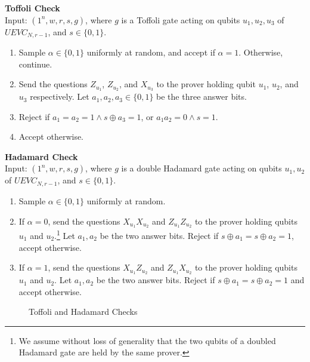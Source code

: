 \vspace{10pt}
\begin{center}
\begin{mdframed}
    \textbf{Toffoli Check} \\
	Input: $(1^n,w,r,s,g)$, where $g$ is a Toffoli gate acting on qubits $u_1,u_2,u_3$ of $UEVC_{N,r-1}$, and $s \in \{0,1\}$. 
	\begin{enumerate}
		\item Sample $\alpha \in \{0,1\}$ uniformly at random, and accept if $\alpha = 1$. Otherwise, continue.
		\item Send the questions $Z_{u_1}$, $Z_{u_2}$, and $X_{u_3}$ to the prover holding qubit $u_1$, $u_2$, and $u_3$ respectively. Let $a_1,a_2,a_3 \in \{0,1\}$ be the three answer bits. 
		\item Reject if $a_1 = a_2 = 1 \wedge s \oplus a_3 = 1$, or $a_1 a_2 = 0 \wedge s = 1$.
		\item Accept otherwise.
	\end{enumerate}    
    \vspace{10pt}
\textbf{Hadamard Check} \\
	Input: $(1^n,w,r,s,g)$, where $g$ is a double Hadamard gate acting on qubits $u_1,u_2$ of $UEVC_{N,r-1}$, and $s \in \{0,1\}$.

	\begin{enumerate}
		\item Sample $\alpha \in \{0,1\}$ uniformly at random.
		\item If $\alpha = 0$, send the questions  $X_{u_1} X_{u_2}$ and $Z_{u_1} Z_{u_2}$ to the prover holding qubits $u_1$ and $u_2$.\footnote{We assume without loss of generality that the two qubits of a doubled Hadamard gate are held by the same prover.} Let $a_1,a_2$ be the two answer bits. Reject if $s \oplus a_1 = s \oplus a_2 = 1$, accept otherwise.
		\item If $\alpha = 1$, send the questions $X_{u_1} Z_{u_2}$ and $Z_{u_1} X_{u_2}$ to the prover holding qubits $u_1$ and $u_2$. Let $a_1,a_2$ be the two answer bits. Reject if $s \oplus a_1 = s \oplus a_2 = 1$ and accept otherwise.
	\end{enumerate}    
\end{mdframed}

\end{center}
\begin{figure}[H]
\caption{Toffoli and Hadamard Checks}
\label{fig:toffoli_hadamard_check}
\end{figure}

